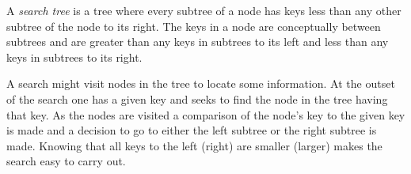 \documentclass[12pt]{article}
\begin{document}
A \emph{search tree} is a tree where every subtree of a node has keys 
less than any other subtree of the node to its right. The keys in a node are 
conceptually between subtrees and are greater than any keys in subtrees to its 
left and less than any keys in subtrees to its right.

A search might  visit nodes in the tree to locate some information. At the outset of
the search one has a given key and seeks to find the node in the tree having that key.
As the nodes are visited a comparison of the node's key to the given key is made
and a decision to go to either the left subtree or the right subtree is made.
Knowing that all keys to the left (right)  are smaller (larger) makes
the search easy to carry out.

\end{document}
